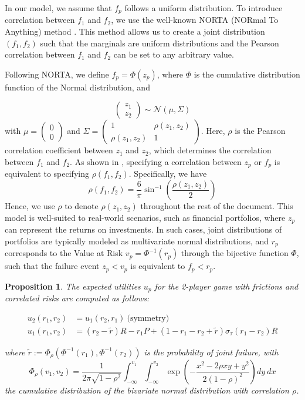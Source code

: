 \documentclass[preprint,12pt,authoryear,doubleblind]{elsarticle}
\newtheorem{proposition}[theorem]{Proposition}
\theoremstyle{definition}
\begin{document}
In our model, we assume that $f_p$ follows a uniform distribution. To introduce correlation between $f_1$ and $f_2$, we use the well-known NORTA (NORmal To Anything) method \citep{norta1997}. This method allows us to create a joint distribution $(f_1, f_2)$ such that the marginals are uniform distributions and the Pearson correlation between $f_1$ and $f_2$ can be set to any arbitrary value.

Following NORTA, we define $f_p = \Phi(z_p)$, where $\Phi$ is the cumulative distribution function of the Normal distribution, and

$$\begin{pmatrix}z_1\\z_2\end{pmatrix} \sim \mathcal{N}\left(\mu, \Sigma\right)$$
with $\mu = \begin{pmatrix}0\\0\end{pmatrix}$ and 
$\Sigma = \begin{pmatrix}
    1 & \rho(z_1, z_2) \\
    \rho(z_1, z_2) & 1
\end{pmatrix}$.
Here, $\rho$ is the Pearson correlation coefficient between $z_1$ and $z_2$, which determines the correlation between $f_1$ and $f_2$.
As shown in \citet{norta1997}, specifying a correlation between $z_p$ or $f_p$ is equivalent to specifying $\rho(f_1, f_2)$. Specifically, we have $$\rho(f_1, f_2) = \frac{6}{\pi}\sin^{-1}\left(\frac{\rho(z_1, z_2)}{2}\right)$$ 
Hence, we use $\rho$ to denote $\rho(z_1, z_2)$ throughout the rest of the document.
This model is well-suited to real-world scenarios, such as financial portfolios, where $z_p$ can represent the returns on investments. In such cases, joint distributions of portfolios are typically modeled as multivariate normal distributions, and $r_p$ corresponds to the Value at Risk $v_p = \Phi^{-1}(r_p)$ through the bijective function $\Phi$, such that the failure event $z_p < v_p$ is equivalent to $f_p < r_p$.

\begin{proposition}
    The expected utilities $u_p$ for the 2-player game with frictions and correlated risks are computed as follows:

    \begin{align}
    \label{eq:utility}
    u_2(r_1, r_2) &= u_1(r_2, r_1) ~\text{(symmetry)}\\
    u_1(r_1, r_2) &= (r_2 - \tilde r) R - r_1 P + (1-r_1-r_2 + \tilde r) \sigma_\tau(r_1 - r_2)R
    \end{align}

    where $\tilde r := \Phi_\rho(\Phi^{-1}(r_1), \Phi^{-1}(r_2))$ is the probability of joint failure, with $$\Phi_\rho(v_1, v_2) = \frac{1}{2\pi\sqrt{1 - \rho^2}} \int_{-\infty}^{v_1}\int_{-\infty}^{v_2} \exp\left(-\frac{x^2 - 2\rho x y + y^2}{2(1-\rho)^2}\right) dy~dx$$ the cumulative distribution of the bivariate normal distribution with correlation $\rho$.
\end{proposition}
\end{document}
